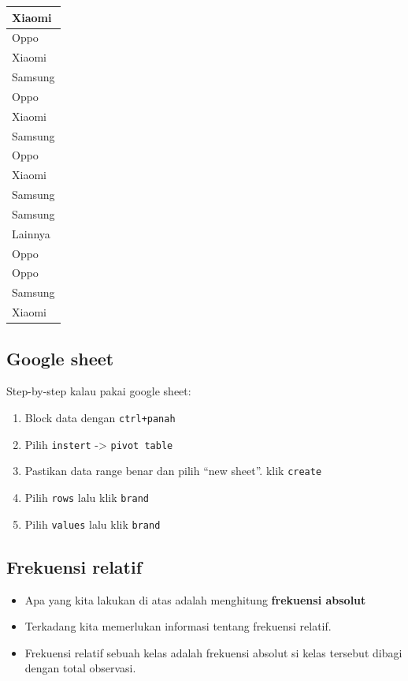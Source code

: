 \documentclass[
  letterpaper,
  DIV=11,
  numbers=noendperiod]{scrartcl}
\providecommand{\tightlist}{%
  \setlength{\itemsep}{0pt}\setlength{\parskip}{0pt}}\usepackage{longtable,booktabs,array}
\begin{document}
\begin{table}
\begin{tabular}[t]{l}
\hline
Xiaomi\\
\hline
Oppo\\
\hline
Xiaomi\\
\hline
Samsung\\
\hline
Oppo\\
\hline
Xiaomi\\
\hline
Samsung\\
\hline
Oppo\\
\hline
Xiaomi\\
\hline
Samsung\\
\hline
Samsung\\
\hline
Lainnya\\
\hline
Oppo\\
\hline
Oppo\\
\hline
Samsung\\
\hline
Xiaomi\\
\hline
\end{tabular}
\end{table}

\subsection{Google sheet}\label{google-sheet}

Step-by-step kalau pakai google sheet:

\begin{enumerate}
\def\labelenumi{\arabic{enumi}.}
\tightlist
\item
  Block data dengan \texttt{ctrl+panah}
\item
  Pilih \texttt{instert} -\textgreater{} \texttt{pivot\ table}
\item
  Pastikan data range benar dan pilih ``new sheet''. klik
  \texttt{create}
\item
  Pilih \texttt{rows} lalu klik \texttt{brand}
\item
  Pilih \texttt{values} lalu klik \texttt{brand}
\end{enumerate}

\subsection{Frekuensi relatif}\label{frekuensi-relatif}

\begin{itemize}
\item
  Apa yang kita lakukan di atas adalah menghitung \textbf{frekuensi
  absolut}
\item
  Terkadang kita memerlukan informasi tentang frekuensi relatif.
\item
  Frekuensi relatif sebuah kelas adalah frekuensi absolut si kelas
  tersebut dibagi dengan total observasi.
\end{itemize}
\end{document}
